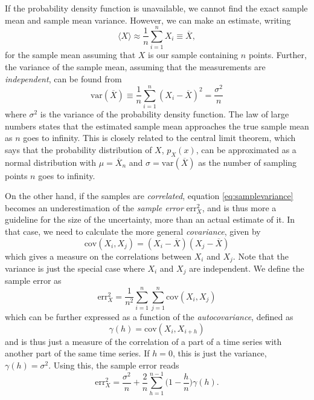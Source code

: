 If the probability density function is unavailable, we cannot find the exact sample mean and sample mean variance. However, we can make an estimate, writing
\begin{equation}
\langle X\rangle\approx \frac{1}{n}\sum_{i=1}^n X_i\equiv\overline{X},
\end{equation}
for the sample mean assuming that $X$ is our sample containing $n$ points. Further, the variance of the sample mean, assuming that the measurements are \textit{independent}, can be found from
\begin{equation}
\text{var}(\overline{X})\equiv\frac{1}{n}\sum_{i=1}^n(X_i-\overline{X})^2=\frac{\sigma^2}{n}
\label{eq:samplevariance}
\end{equation}
where $\sigma^2$ is the variance of the probability density function. The law of large numbers states that the estimated sample mean approaches the true sample mean as $n$ goes to infinity. This is closely related to the central limit theorem, which says that the probability distribution of $X$, $p_X(x)$, can be approximated as a normal distribution with $\mu=\overline{X}_n$ and $\sigma=\text{var}(\overline{X})$ as the number of sampling points $n$ goes to infinity. 

On the other hand, if the samples are \textit{correlated}, equation \eqref{eq:samplevariance} becomes an underestimation of the \textit{sample error} $\text{err}_X^2$, and is thus more a guideline for the size of the uncertainty, more than an actual estimate of it. In that case, we need to calculate the more general \textit{covariance}, given by 
\begin{equation}
\text{cov}(X_i,X_j)=(X_i-\overline{X})(X_j-\overline{X})
\end{equation}
which gives a measure on the correlations between $X_i$ and $X_j$. Note that the variance is just the special case where $X_i$ and $X_j$ are independent. We define the sample error as
\begin{equation}
\text{err}_{X}^2=\frac{1}{n^2}\sum_{i=1}^n\sum_{j=1}^n\text{cov}(X_i,X_j)
\end{equation}
which can be further expressed as a function of the \textit{autocovariance}, defined as 
\begin{equation}
\gamma(h)=\text{cov}(X_i,X_{i+h})
\end{equation}
and is thus just a measure of the correlation of a part of a time series with another part of the same time series. If $h=0$, this is just the variance, $\gamma(h)=\sigma^2$. Using this, the sample error reads
\begin{equation}
\text{err}_X^2=\frac{\sigma^2}{n}+\frac{2}{n}\sum_{h=1}^{n-1}\Big(1-\frac{h}{n}\Big)\gamma(h).
\label{eq:samplevariance2}
\end{equation}

